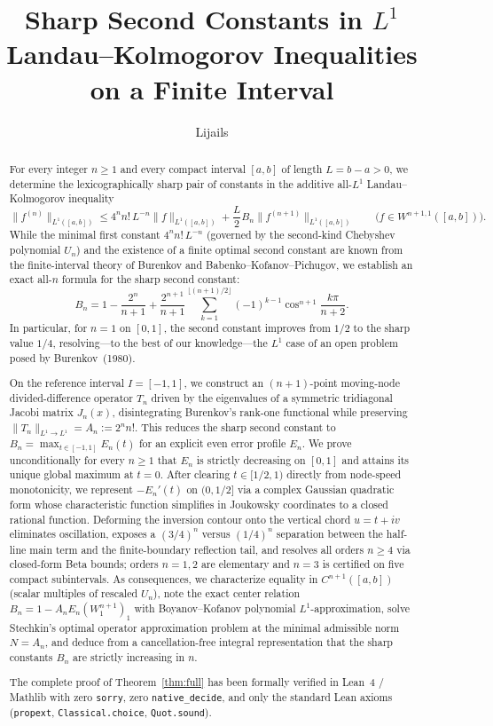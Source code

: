 \documentclass[11pt,a4paper]{article}
\title{Sharp Second Constants in $L^1$ Landau--Kolmogorov Inequalities\\
on a Finite Interval}
\author{Lijails}
\date{}
\newcommand{\code}[1]{\nolinkurl{#1}}
\theoremstyle{remark}
\numberwithin{equation}{section}
\begin{document}
\maketitle

\begin{abstract}
For every integer $n \ge 1$ and every compact interval $[a,b]$ of length $L = b - a > 0$, we determine the lexicographically sharp pair of constants in the additive all-$L^1$ Landau--Kolmogorov inequality
\[
    \lVert f^{(n)}\rVert_{L^1([a,b])}
    \le 4^n n!\,L^{-n}\lVert f\rVert_{L^1([a,b])}
      + \frac{L}{2}B_n\lVert f^{(n+1)}\rVert_{L^1([a,b])}
    \qquad \bigl(f \in W^{n+1,1}([a,b])\bigr).
\]
While the minimal first constant $4^n n!\,L^{-n}$ (governed by the second-kind Chebyshev polynomial $U_n$) and the existence of a finite optimal second constant are known from the finite-interval theory of Burenkov and Babenko--Kofanov--Pichugov, we establish an exact all-$n$ formula for the sharp second constant:
\[
    B_n
    = 1 - \frac{2^n}{n+1}
      + \frac{2^{n+1}}{n+1}\sum_{k=1}^{\lfloor(n+1)/2\rfloor}(-1)^{k-1}\cos^{n+1}\frac{k\pi}{n+2}.
\]
In particular, for $n = 1$ on $[0,1]$, the second constant improves from $1/2$ to the sharp value $1/4$, resolving---to the best of our knowledge---the $L^1$ case of an open problem posed by Burenkov~(1980).

On the reference interval $I = [-1,1]$, we construct an $(n+1)$-point moving-node divided-difference operator $T_n$ driven by the eigenvalues of a symmetric tridiagonal Jacobi matrix $J_n(x)$, disintegrating Burenkov's rank-one functional while preserving $\lVert T_n\rVert_{L^1 \to L^1} = A_n := 2^n n!$. This reduces the sharp second constant to $B_n = \max_{t \in [-1,1]} E_n(t)$ for an explicit even error profile $E_n$. We prove unconditionally for every $n \ge 1$ that $E_n$ is strictly decreasing on $[0,1]$ and attains its unique global maximum at $t = 0$. After clearing $t \in [1/2,1)$ directly from node-speed monotonicity, we represent $-E_n'(t)$ on $(0,1/2]$ via a complex Gaussian quadratic form whose characteristic function simplifies in Joukowsky coordinates to a closed rational function. Deforming the inversion contour onto the vertical chord $u = t + iv$ eliminates oscillation, exposes a $(3/4)^n$ versus $(1/4)^n$ separation between the half-line main term and the finite-boundary reflection tail, and resolves all orders $n \ge 4$ via closed-form Beta bounds; orders $n = 1, 2$ are elementary and $n = 3$ is certified on five compact subintervals. As consequences, we characterize equality in $C^{n+1}([a,b])$ (scalar multiples of rescaled $U_n$), note the exact center relation $B_n = 1 - A_n E_n(W_1^{n+1})_1$ with Boyanov--Kofanov polynomial $L^1$-approximation, solve Stechkin's optimal operator approximation problem at the minimal admissible norm $N = A_n$, and deduce from a cancellation-free integral representation that the sharp constants $B_n$ are strictly increasing in $n$.

The complete proof of Theorem~\ref{thm:full} has been formally verified in Lean~4 / Mathlib with zero \code{sorry}, zero \code{native_decide}, and only the standard Lean axioms (\code{propext}, \code{Classical.choice}, \code{Quot.sound}).
\end{abstract}
\end{document}
